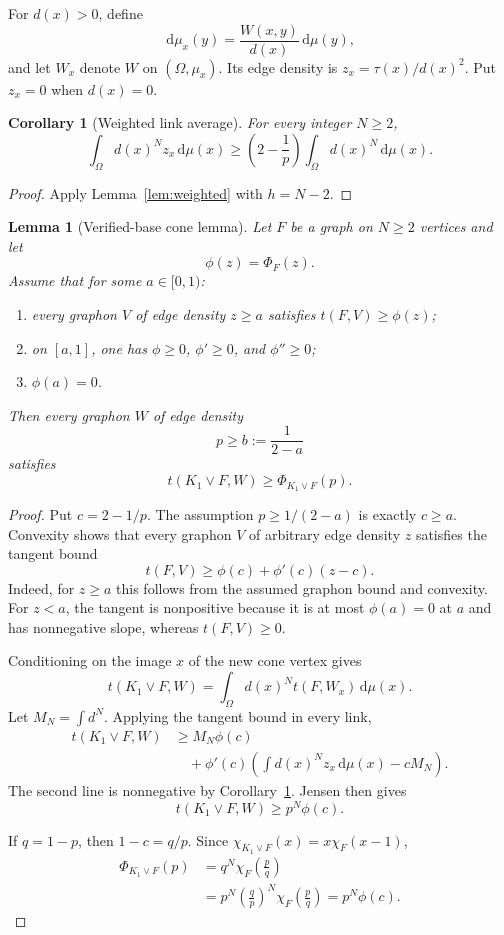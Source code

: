 \documentclass[11pt]{article}
\newtheorem{lemma}[theorem]{Lemma}
\newtheorem{corollary}[theorem]{Corollary}
\newcommand{\dd}{\,\mathrm{d}}
\newcommand{\join}{\mathbin{\vee}}
\begin{document}
For $d(x)>0$, define
\[
\dd\mu_x(y)=\frac{W(x,y)}{d(x)}\dd\mu(y),
\]
and let $W_x$ denote $W$ on $(\Omega,\mu_x)$.  Its edge density is
$z_x=\tau(x)/d(x)^2$.  Put $z_x=0$ when $d(x)=0$.

\begin{corollary}[Weighted link average]
\label{cor:average}
For every integer $N\geq2$,
\[
\int_\Omega d(x)^Nz_x\dd\mu(x)
\geq
\left(2-\frac1p\right)
\int_\Omega d(x)^N\dd\mu(x).
\]
\end{corollary}

\begin{proof}
Apply Lemma~\ref{lem:weighted} with $h=N-2$.
\end{proof}

\begin{lemma}[Verified-base cone lemma]
\label{lem:cone}
Let $F$ be a graph on $N\geq2$ vertices and let
\[
\phi(z)=\Phi_F(z).
\]
Assume that for some $a\in[0,1)$:
\begin{enumerate}
\item every graphon $V$ of edge density $z\geq a$ satisfies
$t(F,V)\geq\phi(z)$;
\item on $[a,1]$, one has $\phi\geq0$, $\phi'\geq0$, and
$\phi''\geq0$;
\item $\phi(a)=0$.
\end{enumerate}
Then every graphon $W$ of edge density
\[
p\geq b:=\frac1{2-a}
\]
satisfies
\[
t(K_1\join F,W)\geq\Phi_{K_1\join F}(p).
\]
\end{lemma}

\begin{proof}
Put $c=2-1/p$.  The assumption $p\geq1/(2-a)$ is exactly $c\geq a$.
Convexity shows that every graphon $V$ of arbitrary edge density $z$
satisfies the tangent bound
\[
t(F,V)\geq\phi(c)+\phi'(c)(z-c).
\]
Indeed, for $z\geq a$ this follows from the assumed graphon bound and
convexity.  For $z<a$, the tangent is nonpositive because it is at most
$\phi(a)=0$ at $a$ and has nonnegative slope, whereas $t(F,V)\geq0$.

Conditioning on the image $x$ of the new cone vertex gives
\[
t(K_1\join F,W)=\int_\Omega d(x)^N t(F,W_x)\dd\mu(x).
\]
Let $M_N=\int d^N$.  Applying the tangent bound in every link,
\begin{align*}
t(K_1\join F,W)
&\geq M_N\phi(c)
\\
&\quad+
\phi'(c)\left(\int d(x)^Nz_x\dd\mu(x)-cM_N\right).
\end{align*}
The second line is nonnegative by Corollary~\ref{cor:average}.  Jensen
then gives
\[
t(K_1\join F,W)\geq p^N\phi(c).
\]

If $q=1-p$, then $1-c=q/p$.  Since
$\chi_{K_1\join F}(x)=x\chi_F(x-1)$,
\begin{align*}
\Phi_{K_1\join F}(p)
&=q^N\chi_F\!\left(\frac pq\right)
\\
&=p^N\left(\frac qp\right)^N
\chi_F\!\left(\frac p q\right)
=p^N\phi(c).
\end{align*}
\end{proof}
\end{document}
